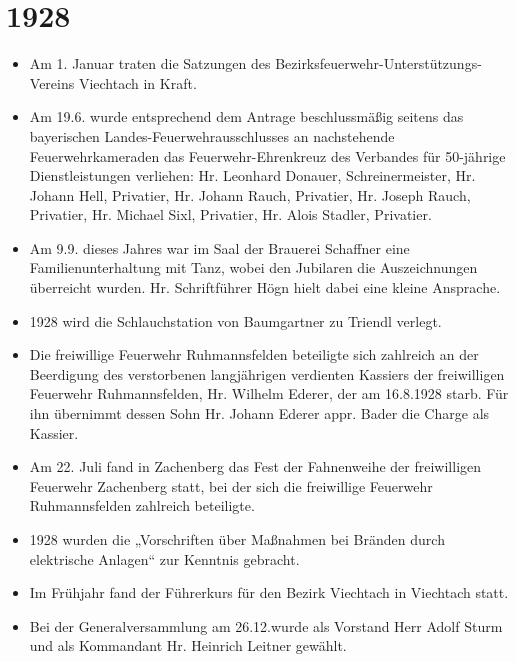\documentclass[12pt,a4paper]{book}
\begin{document}
\section*{1928}

\begin{itemize}
\item Am 1. Januar traten die Satzungen des Bezirksfeuerwehr-Unterstützungs-
Vereins Viechtach in Kraft.

\item Am 19.6. wurde entsprechend dem Antrage beschlussmäßig seitens das
bayerischen Landes-Feuerwehrausschlusses an nachstehende Feuerwehrkameraden das
Feuerwehr-Ehrenkreuz des Verbandes für 50-jährige Dienstleistungen verliehen:
Hr. Leonhard Donauer, Schreinermeister, Hr. Johann Hell, Privatier, Hr. Johann
Rauch, Privatier, Hr. Joseph Rauch, Privatier, Hr. Michael Sixl, Privatier, Hr.
Alois Stadler, Privatier.

\item Am 9.9. dieses Jahres war im Saal der Brauerei Schaffner eine
Familienunterhaltung mit Tanz, wobei den Jubilaren die Auszeichnungen überreicht
wurden. Hr. Schriftführer Högn hielt dabei eine kleine Ansprache.

\item 1928 wird die Schlauchstation von Baumgartner zu Triendl verlegt.

\item Die freiwillige Feuerwehr Ruhmannsfelden beteiligte sich zahlreich an der
Beerdigung des verstorbenen langjährigen verdienten Kassiers der freiwilligen
Feuerwehr Ruhmannsfelden, Hr. Wilhelm Ederer, der am 16.8.1928 starb. Für ihn
übernimmt dessen Sohn Hr. Johann Ederer appr. Bader die Charge als Kassier.

\item Am 22. Juli fand in Zachenberg das Fest der Fahnenweihe der freiwilligen
Feuerwehr Zachenberg statt, bei der sich die freiwillige Feuerwehr
Ruhmannsfelden zahlreich beteiligte.

\item 1928 wurden die „Vorschriften über Maßnahmen bei Bränden durch elektrische
Anlagen“ zur Kenntnis gebracht.

\item Im Frühjahr fand der Führerkurs für den Bezirk Viechtach in Viechtach
statt.

\item Bei der Generalversammlung am 26.12.wurde als Vorstand Herr Adolf Sturm
und als Kommandant Hr. Heinrich Leitner gewählt.
\end{itemize}
\end{document}
